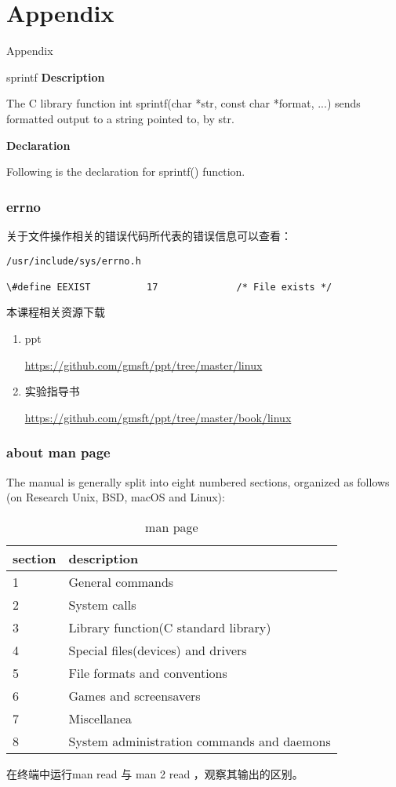\documentclass{beamer}
\begin{document}
\section{Appendix}
\begin{frame}
\Huge{\centerline{Appendix}}
\end{frame}
\begin{frame}[fragile]{sprintf}
\textbf{Description}

The C library function int sprintf(char *str, const char *format, ...) sends formatted output to a string pointed to, by str.

\textbf{Declaration}

Following is the declaration for sprintf() function.

\end{frame}
\begin{frame}[fragile]
\frametitle{errno}
\label{ferr}
关于文件操作相关的错误代码所代表的错误信息可以查看：
\begin{block}{}
\begin{lstlisting}
/usr/include/sys/errno.h

\#define EEXIST          17              /* File exists */
\end{lstlisting}
\end{block}
\end{frame}
\begin{frame}{本课程相关资源下载}
\begin{enumerate}
\item
ppt

\url{https://github.com/gmsft/ppt/tree/master/linux}
\item
实验指导书

\url{https://github.com/gmsft/ppt/tree/master/book/linux}
\end{enumerate}
\end{frame}
\begin{frame}
\frametitle{about man page}
The manual is generally split into eight numbered sections, organized as follows (on Research Unix, BSD, macOS and Linux):
\begin{table}
\begin{tabular}{ll}
\toprule
\textbf{section} & \textbf{description} \\
\midrule
1 & General commands\\
 2 & System calls\\
 3& Library function(C standard library)\\
 4 & Special files(devices) and drivers\\
  5 & File formats and conventions\\
  6  & Games and screensavers\\
   7  & Miscellanea\\
   8   & System administration commands and daemons\\  
\bottomrule
\end{tabular}
\caption{man page}
\end{table}

在终端中运行man read 与 man 2 read ，观察其输出的区别。
\end{frame}
\end{document}

